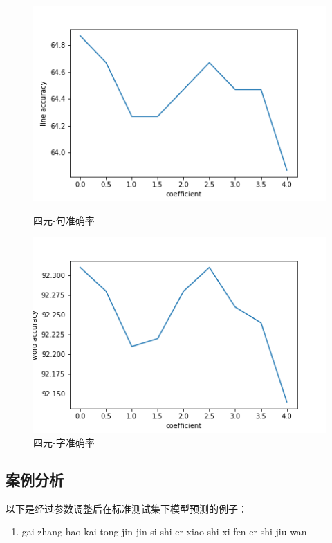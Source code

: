\documentclass{article}
\begin{document}
\begin{spacing}{1.1}
\begin{figure}[h]
	\centering
	\begin{minipage}{0.2\linewidth}
		\centering
		\includegraphics[width=1\linewidth]{pic/accuracy01.png}
		\caption{四元-句准确率}
	\end{minipage}
	\begin{minipage}{0.2\linewidth}
		\centering
		\includegraphics[width=1\linewidth]{pic/accuracy02.png}
		\caption{四元-字准确率}
	\end{minipage}
	
\end{figure}
\subsection{案例分析}
以下是经过参数调整后在标准测试集下模型预测的例子：
\begin{enumerate}
	\item gai zhang hao kai tong jin jin si shi er xiao shi xi fen er shi jiu wan
	

\end{enumerate}
\end{spacing}
\end{document}
